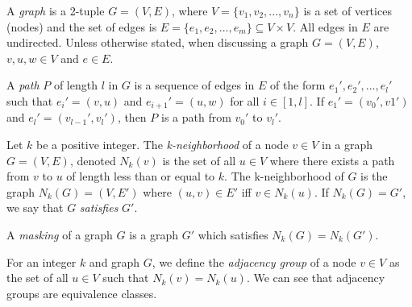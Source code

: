 \begin{dfn}
A \emph{graph} is a 2-tuple $G = (V,E)$, where $V = \{v_1,v_2,...,v_n\}$ is a set of vertices (nodes) and the set of edges is $E = \{e_1,e_2,...,e_m\} \subseteq V \times V$. All edges in $E$ are undirected. Unless otherwise stated, when discussing a graph $G=(V,E)$, $v,u,w \in V$ and $e \in E$. 
\end{dfn}

\begin{dfn}
 A \emph{path} $P$ of length $l$ in $G$ is a sequence of edges in $E$ of the form $e_1', e_2', ...,e_l'$ such that $e_i' = (v,u)$ and $e_{i+1}' = (u,w)$ for all $i \in [1,l]$. If $e_1' = (v_0', v1')$ and $e_l' = (v_{l-1}', v_l')$, then $P$ is a path from $v_0'$ to $v_l'$. 
\end{dfn}

\begin{dfn}
Let $k$ be a positive integer. The \emph{k-neighborhood} of a node $v \in V$ in a graph $G = (V,E)$, denoted $N_k(v)$ is the set of all $u \in V$ where there exists a path from $v$ to $u$ of length less than or equal to $k$. The k-neighborhood of $G$ is the graph $N_k(G) = (V, E')$ where $(u,v) \in E'$ iff $v \in N_k(u)$. If $N_k(G) = G'$, we say that $G$ \emph{satisfies} $G'$. 
\end{dfn}

\begin{dfn}
A \emph{masking} of a graph $G$ is a graph $G'$ which satisfies $N_k(G) = N_k(G')$.\\
\end{dfn}

\begin{dfn}
For an integer $k$ and graph $G$, we define the \emph{adjacency group} of a node $v \in V$ as the set of all $u \in V$ such that $N_k(v) = N_k(u)$. We can see that adjacency groups are equivalence classes.
\end{dfn}
